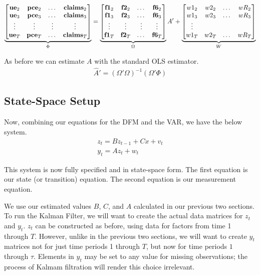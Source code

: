 \documentclass[11pt, letterpaper]{article}
\newcommand{\vv}[1]{\textcolor{black}{\mathbf{#1}}}
\begin{document}
\begin{equation}
\underbrace{\begin{bmatrix}
\vv{ue}_{2} & \vv{pce}_{2} & \dots & \vv{claims}_{2}\\
\vv{ue}_{3} & \vv{pce}_{3} & \dots & \vv{claims}_{3}\\
\vdots & \vdots & \vdots & \vdots \\
\vv{ue}_{T} & \vv{pce}_{T} & \dots & \vv{claims}_{T}\\
\end{bmatrix}}_{\Phi}
=
\underbrace{\begin{bmatrix}
\vv{f1}_{2} & \vv{f2}_{2} & \dots & \vv{f6}_{2}\\
\vv{f1}_{3} & \vv{f2}_{3} & \dots & \vv{f6}_{3}\\
\vdots & \vdots & \vdots & \vdots \\
\vv{f1}_{T} & \vv{f2}_{T} & \dots & \vv{f6}_{T}\\
\end{bmatrix}}_{\Omega}
A'
 +
\underbrace{\begin{bmatrix}
w1_2 & w2_2 & \dots & wR_2\\
w1_3 & w2_3 & \dots & wR_3\\
\vdots\\
w1_T & w2_T & \dots & wR_T\\
\end{bmatrix}}_{W}
\end{equation}

As before we can estimate $A$ with the standard OLS estimator.
\begin{align*}
\widehat{A}' = (\Omega' \Omega)^{-1} (\Omega'\Phi)
\end{align*}


\subsection{State-Space Setup}
Now, combining our equations for the DFM and the VAR, we have the below system.
\begin{align*}
z_t = B z_{t-1} + Cx + v_t\\
y_t = A z_t + w_t
\end{align*}

This system is now fully specified and in state-space form. The first equation is our state (or transition) equation. The second equation is our measurement equation. 

We use our estimated values $B$, $C$, and $A$ calculated in our previous two sections. To run the Kalman Filter, we will want to create the actual data matrices for $z_t$ and $y_t$. $z_t$ can be constructed as before, using data for factors from time 1 through $T$. However, unlike in the previous two sections, we will want to create $y_t$ matrices not for just time periods 1 through $T$, but now for time periods $1$ through $\tau$. Elements in $y_t$ may be set to any value for missing observations; the process of Kalmam filtration will render this choice irrelevant.
\end{document}
